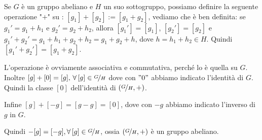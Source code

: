 \documentclass[../main.tex]{subfiles}
\begin{document}
Se $G$ è un gruppo abeliano e $H$ un suo sottogruppo, possiamo definire la seguente operazione "$+$"
su : $[g_1] + [g_2] := [g_1 + g_2]$, vediamo che è ben definita:
se $g_{1}' = g_1 + h_1 \text{ e } g_{2}' = g_2 + h_2$, allora $[g_{1}'] = [g_1]
$, $[g_{2}'] = [g_2]$ e $g_{1}' + g_{2}' = g_1 + h_1 + g_2 + h_2 = g_1 + g_2 + h$,
dove $h = h_1 + h_2 \in H$. Quindi $[g_{1}' + g_{2}'] = [g_1 + g_2]$.

L'operazione è ovviamente associativa e commutativa, perché lo è quella su $G$.
Inoltre $[g] + [0] = [g] \text{, } \forall [g] \in \nicefrac{G}{H}$ dove con $"0"$
abbiamo indicato l'identità di $G$. Quindi la classe $[0]$ dell'identità di $(\nicefrac{G}{H} , +)$.

Infine $[g] + [-g] = [g-g] = [0]$, dove con $-g$ abbiamo indicato l'inverso di $g$ in $G$.

Quindi $-[g] = [-g], \forall [g] \in \nicefrac{G}{H}$, ossia $(\nicefrac{G}{H},+)$ è un gruppo abeliano.
\end{document}
